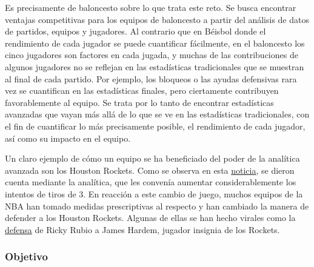 \documentclass[]{article}
\begin{document}
Es precisamente de baloncesto sobre lo que trata este reto. Se busca
encontrar ventajas competitivas para los equipos de baloncesto a partir
del análisis de datos de partidos, equipos y jugadores. Al contrario que
en Béisbol donde el rendimiento de cada jugador se puede cuantificar
fácilmente, en el baloncesto los cinco jugadores son factores en cada
jugada, y muchas de las contribuciones de algunos jugadores no se
reflejan en las estadísticas tradicionales que se muestran al final de
cada partido. Por ejemplo, los bloqueos o las ayudas defensivas rara vez
se cuantifican en las estadísticas finales, pero ciertamente contribuyen
favorablemente al equipo. Se trata por lo tanto de encontrar
estadísticas avanzadas que vayan más allá de lo que se ve en las
estadísticas tradicionales, con el fin de cuantificar lo más
precisamente posible, el rendimiento de cada jugador, así como su
impacto en el equipo.

Un claro ejemplo de cómo un equipo se ha beneficiado del poder de la
analítica avanzada son los Houston Rockets. Como se observa en esta
\href{https://as.com/baloncesto/2018/04/16/nba/1523870600_734693.html}{noticia},
se dieron cuenta mediante la analítica, que les convenía aumentar
considerablemente los intentos de tiros de 3. En reacción a este cambio
de juego, muchos equipos de la NBA han tomado medidas prescriptivas al
respecto y han cambiado la manera de defender a los Houston Rockets.
Algunas de ellas se han hecho virales como la
\href{https://www.youtube.com/watch?v=buYqOJWc-fE\&t=1s}{defensa} de
Ricky Rubio a James Hardem, jugador insignia de los Rockets.

\subsubsection{Objetivo}\label{objetivo}
\end{document}
